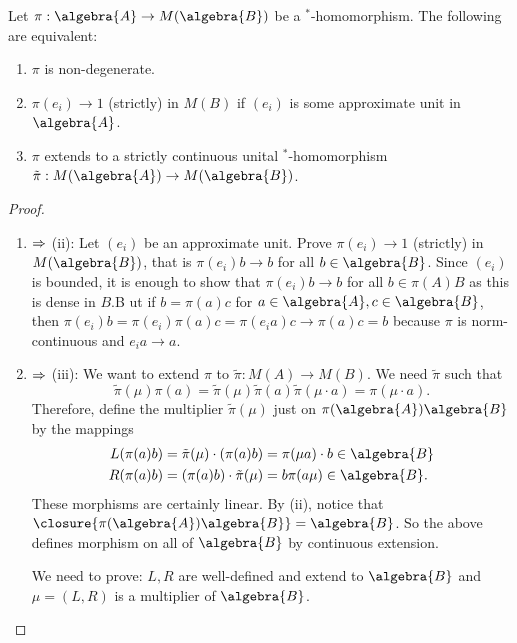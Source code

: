 \documentclass[a4paper]{article}
\begin{document}
\begin{lemma}
	Let $\pi: \algebra{A} \to M(\algebra{B})$ be a $^*$-homomorphism. The following are equivalent:
	\begin{enumerate}
		\item $\pi$ is non-degenerate.
		\item $\pi(e_i) \to 1$ (strictly) in $M(B)$ if $(e_i)$ is some approximate unit in $\algebra{A}$.
		\item $\pi$ extends to a strictly continuous unital $^*$-homomorphism $\tilde{\pi}: M(\algebra{A}) \to M(\algebra{B})$.
	\end{enumerate}
\end{lemma}

\begin{proof}~
	\begin{enumerate}
		\item $\Rightarrow$ (ii): Let $(e_i)$ be an approximate unit. 
		Prove $\pi(e_i) \to 1$ (strictly) in $M(\algebra{B})$, that is $\pi(e_i) b \to b$ for all $b \in \algebra{B}$.
		Since $(e_i)$ is bounded, it is enough to show that $\pi(e_i) b \to b$ for all $b \in \pi(A) B$ as this is dense in $B$.B
		ut if $b = \pi(a) c$ for $a \in \algebra{A}, c \in \algebra{B}$, then $\pi(e_i) b = \pi(e_i) \pi(a) c = \pi(e_i a) c \to \pi(a) c = b$ because $\pi$ is norm-continuous and $e_i a \to a$.  
		\item $\Rightarrow$ (iii): We want to extend $\pi$ to $\tilde{\pi}: M(A) \to M(B)$.
		We need $\tilde{\pi}$ such that 
		\begin{equation*}
			\tilde{\pi}(\mu) \pi(a) = \tilde{\pi}(\mu) \tilde{\pi}(a)  \tilde{\pi}(\mu \cdot a) = \pi(\mu \cdot a)\text{.}
		\end{equation*}
		Therefore, define the multiplier $\tilde{\pi}(\mu)$ just on $\pi(\algebra{A}) \algebra{B}$ by the mappings
		\begin{align*}
			L(\pi(a) b) = \tilde{\pi}(\mu) \cdot (\pi(a) b) &= \pi(\mu a) \cdot b \in \algebra{B}\\
			R(\pi(a) b) = (\pi(a) b) \cdot \tilde{\pi}(\mu) &= b \pi(a \mu) \in \algebra{B} \text{.}
		\end{align*}
		These morphisms are certainly linear.
		By (ii), notice that $\closure{\pi(\algebra{A}) \algebra{B}} = \algebra{B}$.
		So the above defines morphism on all of $\algebra{B}$ by continuous extension.

		We need to prove: $L,R$ are well-defined and extend to $\algebra{B}$ and $\mu = (L,R)$ is a multiplier of $\algebra{B}$.


\end{enumerate}
\end{proof}
\end{document}
